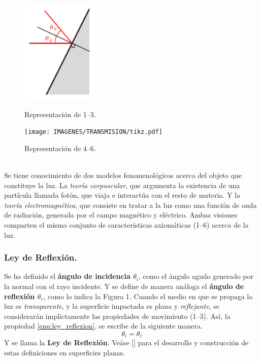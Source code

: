 \documentclass[12pt,a4paper]{article}
\begin{document}
\begin{figure}[ht]
\begin{minipage}{0.5\linewidth}
	\centering
	\includegraphics[height = 5cm]{IMAGENES/REFLEXIÓN/tikz.pdf}
	\caption{Representación de 1--3.}
\end{minipage}\hspace{5mm}
\begin{minipage}{0.5\linewidth}
	\centering
	\texttt{[image: IMAGENES/TRANSMISION/tikz.pdf]}
	\caption{Representación de 4--6.}
\end{minipage}
\end{figure}\\
Se tiene conocimiento de dos modelos fenomenológicos acerca del objeto que constituye la luz. La \textit{teoría corpuscular}, que argumenta la existencia de una partícula llamada fotón, que viaja e interactúa con el resto de materia. Y la \textit{teoría electromagnética}, que consiste en tratar a la luz como una función de onda  de radiación, generada por el campo magnético y eléctrico. Ambas visiones comparten el mismo conjunto de características axiomáticas (1--6) acerca de la luz.

\subsubsection{Ley de Reflexión.} %
\label{subs:ley_de_refraccion}
Se ha definido el \textbf{ángulo de incidencia \(\theta _i\)}, como el ángulo agudo generado por la normal con el rayo incidente. Y se define de manera análoga el \textbf{ángulo de reflexión \(\theta _r\)}, como lo indica la Figura 1. Cuando el medio en que se propaga la luz es \textit{transparente}, y la superficie impactada es plana y \textit{reflejante}, se considerarán implíctamente las propiedades de movimiento (1--3). Así, la propiedad \ref{enu:ley_reflexion}, se escribe de la siguiente manera.
\begin{equation}
	\theta _i = \theta _r
	\label{eq:ley_reflexion}
\end{equation}
Y se llama la \textbf{Ley de Reflexión}. Veáse \([\)\cite{fisica_1}\(]\) para el desarrollo y construcción de estas definiciones en superficies planas.
\end{document}
